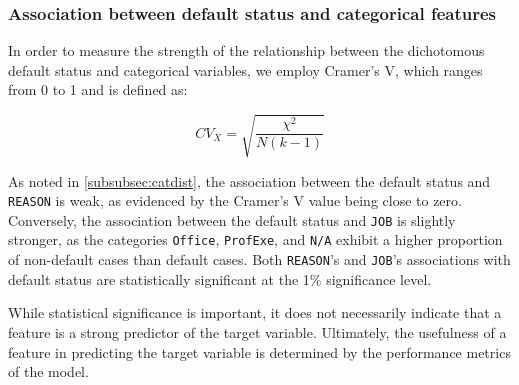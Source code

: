        \subsubsection{Association between default status and categorical features}
        \label{subsubsec:target-cat-ass}
        
        In order to measure the strength of the relationship between the dichotomous default status and categorical variables, we employ Cramer's V, which ranges from 0 to 1 and is defined as:
        
        
        \begin{equation}\label{eq}
                CV_{X} = \sqrt{\frac{\chi^{2}}{N\left(k-1\right)}}
        \end{equation}
        
        
        As noted in \autoref{subsubsec:catdist}, the association between the default status and \texttt{REASON} is weak, as evidenced by the Cramer's V value being close to zero.
        Conversely, the association between the default status and \texttt{JOB} is slightly stronger, as the categories \texttt{Office}, \texttt{ProfExe}, and \texttt{N/A} exhibit a higher proportion of non-default cases than default cases.
        Both \texttt{REASON}'s and \texttt{JOB}'s associations with default status are statistically significant at the 1\% significance level.
        
        While statistical significance is important, it does not necessarily indicate that a feature is a strong predictor of the target variable.
        Ultimately, the usefulness of a feature in predicting the target variable is determined by the performance metrics of the model.
        
